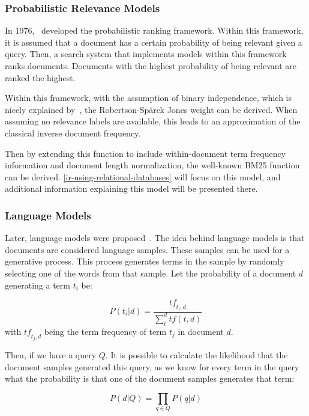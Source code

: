 \subsubsection{Probabilistic Relevance Models}
In 1976,~\citeauthor{RSJ} developed the probabilistic ranking framework. Within this framework, it is assumed that a document has a certain probability of being relevant given a query. Then, a search system that implements models within this framework ranks documents. Documents with the highest probability of being relevant are ranked the highest.

Within this framework, with the assumption of binary independence, which is nicely explained by~\citet{bm25-beyond}, the Robertson-Sp{\"a}rck Jones weight can be derived. When assuming no relevance labels are available, this leads to an approximation of the classical inverse document frequency.

Then by extending this function to include within-document term frequency information and document length normalization, the well-known BM25 function can be derived. \cref{ir-using-relational-databases} will focus on this model, and additional information explaining this model will be presented there.

\subsubsection{Language Models}
Later, language models were proposed~\citep{croft_lm, hiemstra_lm, zhai_lm}. The idea behind language models is that documents are considered language samples. These samples can be used for a generative process. This process generates terms in the sample by randomly selecting one of the words from that sample. Let the probability of a document $d$ generating a term $t_i$ be:

\begin{equation}
	P(t_i|d) = \frac{\mathit{tf}_{t_i,d}}{\sum_t^d tf(t, d)}
\end{equation}
with $\mathit{tf}_{t_j, d}$ being the term frequency of term $t_j$ in document $d$. 

Then, if we have a query $Q$. It is possible to calculate the likelihood that the document samples generated this query, as we know for every term in the query what the probability is that one of the document samples generates that term: 

\begin{equation}
	P(d|Q) = \prod_{q \in Q} P(q | d)
\end{equation}

